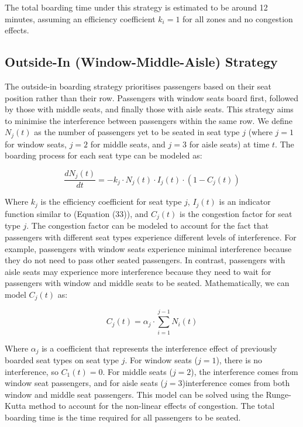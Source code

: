 \documentclass[12pt]{article}
\begin{document}
The total boarding time under this strategy is estimated to be around 12 minutes, assuming an efficiency coefficient $k_i = 1$ for all zones and no congestion effects.

\subsection{Outside-In (Window-Middle-Aisle) Strategy}

The outside-in boarding strategy prioritises passengers based on their seat position rather than their row. Passengers with window seats board first, followed by those with middle seats, and finally those with aisle seats. This strategy aims to minimise the interference between passengers within the same row. We define $N_j(t)$ as the number of passengers yet to be seated in seat type $j$ (where $j = 1$ for window seats, $j = 2$ for middle seats, and $j = 3$ for aisle seats) at time $t$. The boarding process for each seat type can be modeled as:

\begin{equation}
\frac{dN_j(t)}{dt} = -k_j \cdot N_j(t) \cdot I_j(t) \cdot (1 - C_j(t))
\end{equation}

Where $k_j$ is the efficiency coefficient for seat type $j$, $I_j(t)$ is an indicator function similar to (Equation (33)), and $C_j(t)$ is the congestion factor for seat type $j$. The congestion factor can be modeled to account for the fact that passengers with different seat types experience different levels of interference. For example, passengers with window seats experience minimal interference because they do not need to pass other seated passengers. In contrast, passengers with aisle seats may experience more interference because they need to wait for passengers with window and middle seats to be seated. Mathematically, we can model $C_j(t)$ as:

\begin{equation}
C_j(t) = \alpha_j \cdot \sum_{i=1}^{j-1} N_i(t)
\end{equation}

Where $\alpha_j$ is a coefficient that represents the interference effect of previously boarded seat types on seat type $j$. For window seats ($j = 1$), there is no interference, so $C_1(t) = 0$. For middle seats ($j = 2$), the interference comes from window seat passengers, and for aisle seats ($j = 3$)interference comes from both window and middle seat passengers. This model can be solved using the Runge-Kutta method to account for the non-linear effects of congestion. The total boarding time is the time required for all passengers to be seated.
\end{document}
